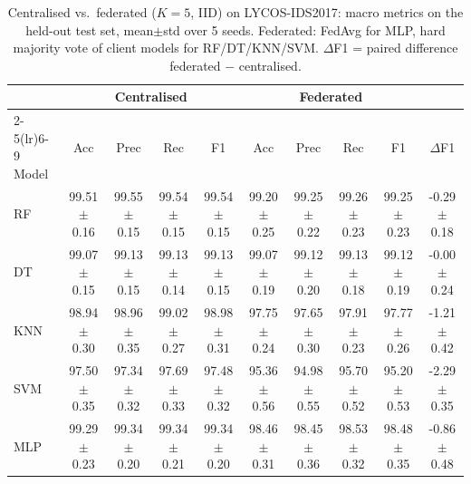 \begin{table}[t]
\centering\footnotesize
\caption{Centralised vs.\ federated ($K=5$, IID) on LYCOS-IDS2017: macro metrics on the held-out test set, mean$\pm$std over 5 seeds. Federated: FedAvg for MLP, hard majority vote of client models for RF/DT/KNN/SVM. $\Delta$F1 = paired difference federated $-$ centralised.}
\label{tab:cent_vs_fed_lycos}
\begin{tabular}{l cccc cccc c}
\toprule
 & \multicolumn{4}{c}{Centralised} & \multicolumn{4}{c}{Federated} & \\
\cmidrule(lr){2-5}\cmidrule(lr){6-9}
Model & Acc & Prec & Rec & F1 & Acc & Prec & Rec & F1 & $\Delta$F1 \\
\midrule
RF & 99.51$\pm$0.16 & 99.55$\pm$0.15 & 99.54$\pm$0.15 & 99.54$\pm$0.15 & 99.20$\pm$0.25 & 99.25$\pm$0.22 & 99.26$\pm$0.23 & 99.25$\pm$0.23 & -0.29$\pm$0.18 \\
DT & 99.07$\pm$0.15 & 99.13$\pm$0.15 & 99.13$\pm$0.14 & 99.13$\pm$0.15 & 99.07$\pm$0.19 & 99.12$\pm$0.20 & 99.13$\pm$0.18 & 99.12$\pm$0.19 & -0.00$\pm$0.24 \\
KNN & 98.94$\pm$0.30 & 98.96$\pm$0.35 & 99.02$\pm$0.27 & 98.98$\pm$0.31 & 97.75$\pm$0.24 & 97.65$\pm$0.30 & 97.91$\pm$0.23 & 97.77$\pm$0.26 & -1.21$\pm$0.42 \\
SVM & 97.50$\pm$0.35 & 97.34$\pm$0.32 & 97.69$\pm$0.33 & 97.48$\pm$0.32 & 95.36$\pm$0.56 & 94.98$\pm$0.55 & 95.70$\pm$0.52 & 95.20$\pm$0.53 & -2.29$\pm$0.35 \\
MLP & 99.29$\pm$0.23 & 99.34$\pm$0.20 & 99.34$\pm$0.21 & 99.34$\pm$0.20 & 98.46$\pm$0.31 & 98.45$\pm$0.36 & 98.53$\pm$0.32 & 98.48$\pm$0.35 & -0.86$\pm$0.48 \\
\bottomrule
\end{tabular}
\end{table}

